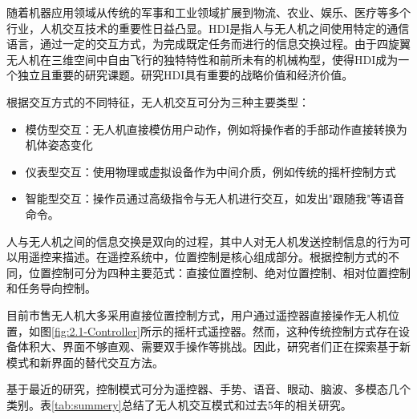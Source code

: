 随着机器应用领域从传统的军事和工业领域扩展到物流、农业、娱乐、医疗等多个行业，人机交互技术的重要性日益凸显。HDI是指人与无人机之间使用特定的通信语言，通过一定的交互方式，为完成既定任务而进行的信息交换过程。由于四旋翼无人机在三维空间中自由飞行的独特特性和前所未有的机械构型，使得HDI成为一个独立且重要的研究课题\cite{tezza2019state}。研究HDI具有重要的战略价值和经济价值\cite{kyrkou2019drones,CUI2022135}。

根据交互方式的不同特征，无人机交互可分为三种主要类型\cite{tezza2019state}：

\begin{itemize}
    \item 模仿型交互：无人机直接模仿用户动作，例如将操作者的手部动作直接转换为机体姿态变化
    \item 仪表型交互：使用物理或虚拟设备作为中间介质，例如传统的摇杆控制方式
    \item 智能型交互：操作员通过高级指令与无人机进行交互，如发出"跟随我"等语音命令。
\end{itemize}

人与无人机之间的信息交换是双向的过程，其中人对无人机发送控制信息的行为可以用遥控来描述。在遥控系统中，位置控制是核心组成部分。根据控制方式的不同，位置控制可分为四种主要范式\cite{funk2018human}：直接位置控制、绝对位置控制、相对位置控制和任务导向控制。

目前市售无人机大多采用直接位置控制方式，用户通过遥控器直接操作无人机位置，如图\ref{fig:2.1-Controller}所示的摇杆式遥控器。然而，这种传统控制方式存在设备体积大、界面不够直观、需要双手操作等挑战。因此，研究者们正在探索基于新模式和新界面的替代交互方法。

基于最近的研究，控制模式可分为遥控器、手势、语音、眼动、脑波、多模态几个类别。表\ref{tab:summery}总结了无人机交互模式和过去5年的相关研究。

